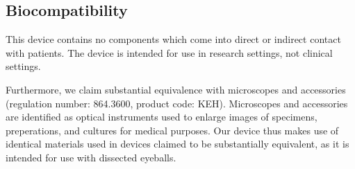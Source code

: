 \newpage
\subsection{Biocompatibility}

This device contains no components which come into direct or indirect
contact with patients. The device is intended for use in research
settings, not clinical settings.

Furthermore, we claim substantial equivalence with microscopes and
accessories (regulation number: 864.3600, product code:
KEH). Microscopes and accessories are identified as optical
instruments used to enlarge images of specimens, preperations, and
cultures for medical purposes. Our device thus makes use of identical
materials used in devices claimed to be substantially equivalent, as
it is intended for use with dissected eyeballs. 
